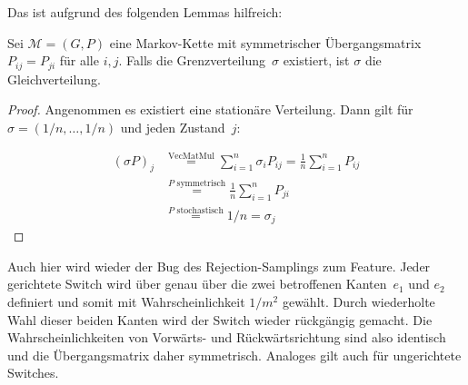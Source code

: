 Das ist aufgrund des folgenden Lemmas hilfreich:
\begin{lemma}
    Sei $\mathcal M = (G, P)$ eine Markov-Kette mit symmetrischer Übergangsmatrix $P_{ij} = P_{ji}$ für alle $i, j$.
    Falls die Grenzverteilung~$\sigma$ existiert, ist $\sigma$ die Gleichverteilung.
\end{lemma}

\begin{proof}
    Angenommen es existiert eine stationäre Verteilung.
    Dann gilt für $\sigma = (1/n, \ldots, 1/n)$ und jeden Zustand~$j$:

    \begin{align}
        (\sigma P) _ j & \stackrel{\text{VecMatMul}}{=} \sum_{i=1}^n \sigma_i P_{ij}
        = \frac 1 n \sum_{i=1}^n P_{ij}                                                   \\
                       & \stackrel{P\text{ symmetrisch}}{=} \frac 1 n \sum_{i=1}^n P_{ji} \\
                       & \stackrel{P\text{ stochastisch}}{=} 1 / n = \sigma_j
    \end{align}
\end{proof}

Auch hier wird wieder der Bug des Rejection-Samplings zum Feature.
Jeder gerichtete Switch wird über genau über die zwei betroffenen Kanten~$e_1$ und $e_2$ definiert und somit mit Wahrscheinlichkeit $1/m^2$ gewählt.
Durch wiederholte Wahl dieser beiden Kanten wird der Switch wieder rückgängig gemacht.
Die Wahrscheinlichkeiten von Vorwärts- und Rückwärtsrichtung sind also identisch und die Übergangsmatrix daher symmetrisch.
Analoges gilt auch für ungerichtete Switches.
